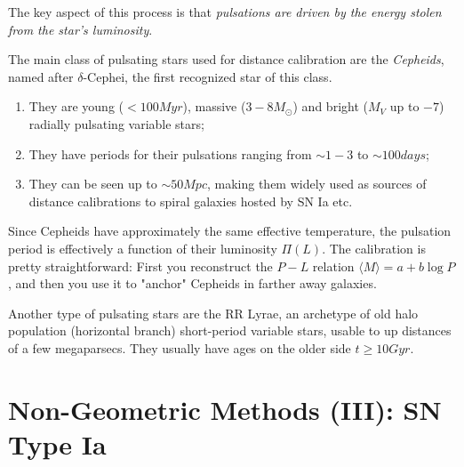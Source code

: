 The key aspect of this process is that \emph{pulsations are driven by the energy stolen from the star’s luminosity}.
\par The main class of pulsating stars used for distance calibration are the \emph{Cepheids}, named after $\delta$-Cephei, the first recognized star of this class. 
\begin{enumerate}
    \item They are young ($<100\unit{Myr}$), massive ($3-8M_{\odot}$) and bright ($M_{V}$ up to $-7$) radially pulsating variable stars;
    \item They have periods for their pulsations ranging from $\sim 1-3$ to $\sim100\unit{days}$;
    \item They can be seen up to $\sim50\unit{Mpc}$, making them widely used as sources of distance calibrations to spiral galaxies hosted by SN Ia etc.
\end{enumerate}
Since Cepheids have approximately the same effective temperature, the pulsation period is effectively a function of their luminosity $\Pi(L)$. The calibration is pretty straightforward: First you reconstruct the $P-L$ relation $\langle M \rangle = a +b\log P$, and then you use it to "anchor" Cepheids in farther away galaxies.
\par Another type of pulsating stars are the RR Lyrae, an archetype of old halo population (horizontal branch) short-period variable stars, usable to up distances of a few megaparsecs. They usually have ages on the older side $t\geq10\unit{Gyr}$.

\section{Non-Geometric Methods (III): SN Type Ia}

